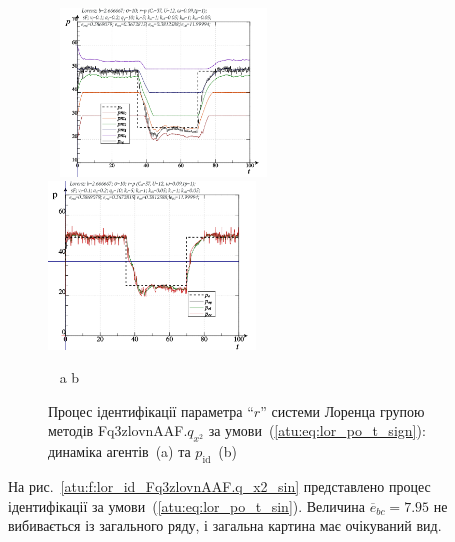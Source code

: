 \begin{figure}[ht!]
  \begin{center}
    ~ \hfill
    \includegraphics[width=0.49\textwidth]{p/cha/lor/Fq3zlovnAAF/lor_Fq3zlovnAAF_qx2-pl_n_sign.png}
    \hfill
    \includegraphics[width=0.49\textwidth]{p/cha/lor/Fq3zlovnAAF/lor_Fq3zlovnAAF_qx2-p_p_sign.png}
    \hfill ~
  \end{center}
  \vspace{-1.0ex}
  \begin{center}
    ~ \hfill a \hfill\hfill b \hfill ~
  \end{center}
  \vspace{-1.5ex}
  \caption{Процес ідентифікації параметра ``$r$'' системи Лоренца групою методів Fq3zlovnAAF.$q_{x^2} $ за умови~(\ref{atu:eq:lor_po_t_sign}): динаміка агентів~(a) та $p_\mathrm{id}$~(b)}
\label{atu:f:lor_id_Fq3zlovnAAF.q_x2_sign}
\end{figure}

На рис.~\ref{atu:f:lor_id_Fq3zlovnAAF.q_x2_sin} представлено процес ідентифікації за
умови~(\ref{atu:eq:lor_po_t_sin}). Величина
$ \overline{e}_{bc} = 7.95 $ не вибивається із загального ряду, і загальна
картина має очікуваний вид.

